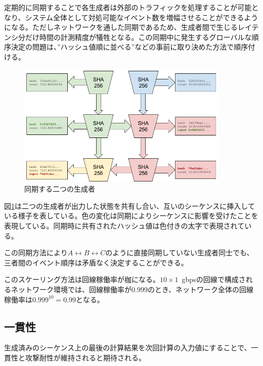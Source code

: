 \documentclass[12pt]{ltjsarticle}
\begin{document}
定期的に同期することで各生成者は外部のトラフィックを処理することが可能となり、システム全体として対処可能なイベント数を増幅させることができるようになる。ただしネットワークを通した同期であるため、生成者間で生じるレイテンシ分だけ時間の計測精度が犠牲となる。この同期中に発生するグローバルな順序決定の問題は、”ハッシュ値順に並べる”などの事前に取り決めた方法で順序付ける。

\begin{figure}
  \begin{center}
    \centering
    \includegraphics[width=0.9\textwidth]{figures/fig_5.png}
    \caption[Fig 5]{同期する二つの生成者\label{fig:poh_scale}}
  \end{center}
  \end{figure}

図\ref{fig:poh_scale}は二つの生成者が出力した状態を共有し合い、互いのシーケンスに挿入している様子を表している。色の変化は同期によりシーケンスに影響を受けたことを表現している。同期時に共有されたハッシュ値は色付きの太字で表現されている。

この同期方法により\(A \leftrightarrow B \leftrightarrow C\)のように直接同期していない生成者同士でも、三者間のイベント順序は矛盾なく決定することができる。

このスケーリング方法は回線稼働率が枷になる。$10 \times 1$~gbpsの回線で構成されるネットワーク環境では、回線稼働率が0.999のとき、ネットワーク全体の回線稼働率は\(0.999^{10} = 0.99 \)となる。

\subsection{一貫性}
生成済みのシーケンス上の最後の計算結果を次回計算の入力値にすることで、一貫性と攻撃耐性が維持されると期待される。\\
\end{document}

